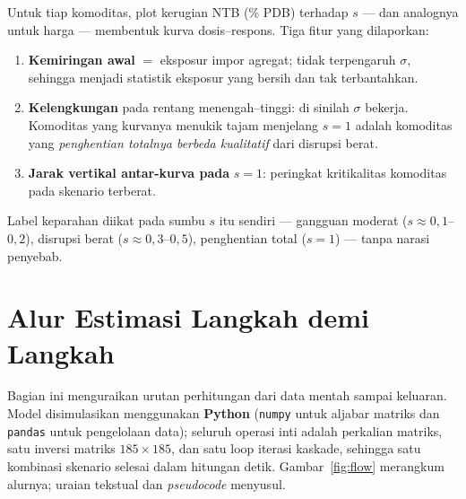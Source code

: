 \documentclass[11pt,a4paper]{article}
\newcommand{\en}[1]{\textit{#1}}   %
\begin{document}
Untuk tiap komoditas, plot kerugian NTB (\% PDB) terhadap $s$ --- dan
analognya untuk harga --- membentuk kurva dosis--respons. Tiga fitur yang
dilaporkan:
\begin{enumerate}[nosep]
\item \textbf{Kemiringan awal} $=$ eksposur impor agregat; tidak
      terpengaruh $\sigma$, sehingga menjadi statistik eksposur yang
      bersih dan tak terbantahkan.
\item \textbf{Kelengkungan} pada rentang menengah--tinggi: di sinilah
      $\sigma$ bekerja. Komoditas yang kurvanya menukik tajam menjelang
      $s = 1$ adalah komoditas yang \emph{penghentian totalnya berbeda
      kualitatif} dari disrupsi berat.
\item \textbf{Jarak vertikal antar-kurva pada} $s = 1$: peringkat
      kritikalitas komoditas pada skenario terberat.
\end{enumerate}
Label keparahan diikat pada sumbu $s$ itu sendiri --- gangguan moderat
($s \approx 0{,}1$--$0{,}2$), disrupsi berat ($s \approx 0{,}3$--$0{,}5$),
penghentian total ($s = 1$) --- tanpa narasi penyebab.

\section{Alur Estimasi Langkah demi Langkah}
\label{sec:algo}

Bagian ini menguraikan urutan perhitungan dari data mentah sampai keluaran.
Model disimulasikan menggunakan \textbf{Python} (\texttt{numpy} untuk
aljabar matriks dan \texttt{pandas} untuk pengelolaan data); seluruh
operasi inti adalah perkalian matriks, satu inversi matriks
$185 \times 185$, dan satu loop iterasi kaskade, sehingga satu kombinasi
skenario selesai dalam hitungan detik. Gambar~\ref{fig:flow}
merangkum alurnya; uraian tekstual dan \en{pseudocode} menyusul.
\end{document}
